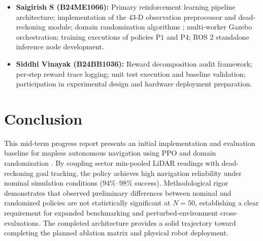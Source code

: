 \documentclass[conference]{IEEEtran}
\begin{document}
\begin{itemize}
    \item \textbf{Saigirish S (B24ME1066):} Primary reinforcement learning pipeline architecture; implementation of the 43-D observation preprocessor and dead-reckoning module; domain randomization algorithms \cite{tobin2017domain, peng2018sim}; multi-worker Gazebo orchestration; training executions of policies $\text{P1}$ and $\text{P4}$; ROS 2 standalone inference node development.
    \item \textbf{Siddhi Vinayak (B24BB1036):} Reward decomposition audit framework; per-step reward trace logging; unit test execution and baseline validation; participation in experimental design and hardware deployment preparation.
\end{itemize}

\section{Conclusion}
This mid-term progress report presents an initial implementation and evaluation baseline for mapless autonomous navigation using PPO \cite{schulman2017proximal} and domain randomization \cite{tobin2017domain, peng2018sim}. By coupling sector min-pooled LiDAR readings with dead-reckoning goal tracking, the policy achieves high navigation reliability under nominal simulation conditions (94\%--98\% success). Methodological rigor demonstrates that observed preliminary differences between nominal and randomized policies are not statistically significant at $N=50$, establishing a clear requirement for expanded benchmarking and perturbed-environment cross-evaluations. The completed architecture provides a solid trajectory toward completing the planned ablation matrix and physical robot deployment.



\end{document}
